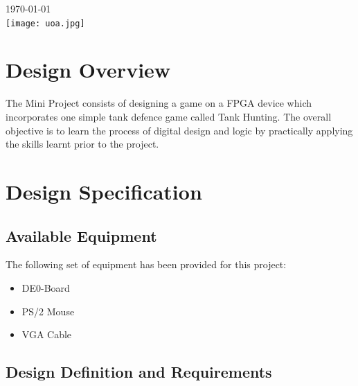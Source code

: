 \documentclass[a4paper,10pt,twoside]{article}
\begin{document}
\begin{titlepage}
{\large \today}\\[2cm] %


\texttt{[image: uoa.jpg]}\\[1cm] %
 

\vfill %

\end{titlepage}

\section{Design Overview}

The Mini Project consists of designing a game on a FPGA device which incorporates one simple tank defence game called Tank Hunting. The overall objective is to learn the process of digital design and logic by practically applying the skills learnt prior to the project.

\section{Design Specification}

\subsection{Available Equipment}

The following set of equipment has been provided for this project:

\begin{itemize}
\item DE0-Board
\item PS/2 Mouse
\item VGA Cable
\end{itemize}

\subsection{Design Definition and Requirements}
\end{document}
